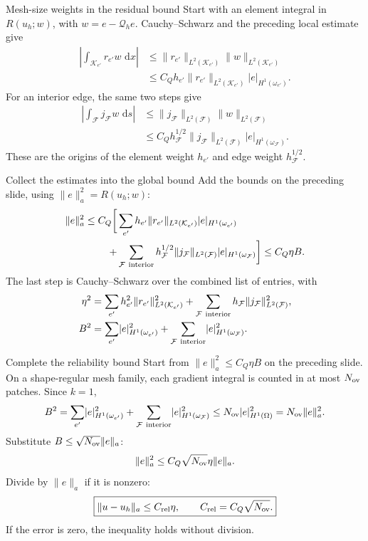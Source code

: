 \documentclass[11pt,aspectratio=169]{beamer}
\newcommand{\dd}{\,\mathrm d}
\newcommand{\Om}{\Omega}
\newcommand{\Qh}{\mathcal Q_h}
\newcommand{\norm}[2][]{\lVert#2\rVert_{#1}}
\newcommand{\seminorm}[2][]{\lvert#2\rvert_{#1}}
\begin{document}
\begin{frame}{Mesh-size weights in the residual bound}
Start with an element integral in $R(u_h;w)$, with $w=e-\Qh e$.
Cauchy--Schwarz and the preceding local estimate give
\begin{align*}
\left|\int_{\mathcal K_{e'}}r_{e'}w\,\dd x\right|
&\le \norm[L^2(\mathcal K_{e'})]{r_{e'}}
      \norm[L^2(\mathcal K_{e'})]{w}\\
&\le C_Qh_{e'}\norm[L^2(\mathcal K_{e'})]{r_{e'}}
      \seminorm[H^1(\omega_{e'})]{e}.
\end{align*}
For an interior edge, the same two steps give
\begin{align*}
\left|\int_{\mathcal F}j_{\mathcal F}w\,\dd s\right|
&\le \norm[L^2(\mathcal F)]{j_{\mathcal F}}\norm[L^2(\mathcal F)]{w}\\
&\le C_Qh_{\mathcal F}^{1/2}\norm[L^2(\mathcal F)]{j_{\mathcal F}}
      \seminorm[H^1(\omega_{\mathcal F})]{e}.
\end{align*}
These are the origins of the element weight $h_{e'}$ and edge weight
$h_{\mathcal F}^{1/2}$.
\end{frame}

\begin{frame}{Collect the estimates into the global bound}
Add the bounds on the preceding slide, using $\norm[a]{e}^2=R(u_h;w)$:
\begin{align*}
\norm[a]{e}^2\le C_Q\bigg[
&\sum_{e'}h_{e'}\norm[L^2(\mathcal K_{e'})]{r_{e'}}
                   \seminorm[H^1(\omega_{e'})]{e}\\
+&\sum_{\mathcal F\ {\rm interior}}h_{\mathcal F}^{1/2}
\norm[L^2(\mathcal F)]{j_{\mathcal F}}
                   \seminorm[H^1(\omega_{\mathcal F})]{e}\bigg]
\le C_Q\eta B.
\end{align*}
The last step is Cauchy--Schwarz over the combined list of entries, with
\begin{align*}
\eta^2&=\sum_{e'}h_{e'}^2\norm[L^2(\mathcal K_{e'})]{r_{e'}}^2
+\sum_{\mathcal F\ {\rm interior}}h_{\mathcal F}
\norm[L^2(\mathcal F)]{j_{\mathcal F}}^2,\\
B^2&=\sum_{e'}\seminorm[H^1(\omega_{e'})]{e}^2
+\sum_{\mathcal F\ {\rm interior}}\seminorm[H^1(\omega_{\mathcal F})]{e}^2.
\end{align*}
\end{frame}

\begin{frame}{Complete the reliability bound}
Start from $\norm[a]{e}^2\le C_Q\eta B$ on the preceding slide.
On a shape-regular mesh family, each gradient integral is counted in at most
$N_{\rm ov}$ patches. Since $k=1$,
\[
 B^2=\sum_{e'}\seminorm[H^1(\omega_{e'})]{e}^2
 +\sum_{\mathcal F\ {\rm interior}}\seminorm[H^1(\omega_{\mathcal F})]{e}^2
 \le N_{\rm ov}\seminorm[H^1(\Om)]{e}^2
       =N_{\rm ov}\norm[a]{e}^2.
\]
Substitute $B\le\sqrt{N_{\rm ov}}\norm[a]{e}$:
\[
\norm[a]{e}^2\le C_Q\sqrt{N_{\rm ov}}\eta\norm[a]{e}.
\]
Divide by $\norm[a]{e}$ if it is nonzero:
\[
\boxed{\norm[a]{u-u_h}\le C_{\rm rel}\eta,\qquad
 C_{\rm rel}=C_Q\sqrt{N_{\rm ov}}.}
\]
If the error is zero, the inequality holds without division.
\end{frame}
\end{document}
